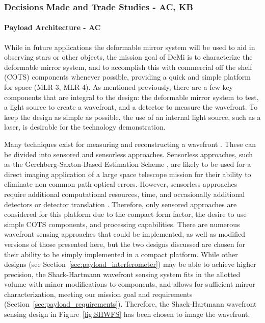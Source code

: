 \documentclass[12pt]{article}
\begin{document}
			\subsubsection{Decisions Made and Trade Studies - AC, KB}

\paragraph{Payload Architecture - AC}

While in future applications the deformable mirror system will be used to aid
in observing stars or other objects, the mission goal of DeMi is to characterize the deformable 
mirror system, and to accomplish this with commercial off the shelf (COTS) components
whenever possible, providing a quick and simple platform for space (MLR-3, MLR-4).
As mentioned previously, there are a few key components that are integral to the design: the 
deformable mirror system to test, a light source to create a wavefront, and a detector to measure the wavefront.
To keep the design as simple as possible, the use of an internal light source, such as a laser, is  desirable for the technology demonstration. 

Many techniques exist for measuring and reconstructing a wavefront \cite{FGadaptiveoptics}.  These can be divided into sensored and sensorless approaches.
Sensorless approaches, such as the Gerchberg-Saxton-Based Estimation Scheme \cite{gerchberg}, are likely to be used for a direct imaging application of a large space telescope mission for their ability to eliminate non-common path optical errors.  However, sensorless approaches require additional computational resources, time, and occasionally additional detectors or detector translation \cite{cahoy2013}.  
Therefore, only sensored
approaches are considered for this platform due to the compact form
factor, the desire to use simple COTS components, and processing capabilities. There are numerous wavefront
sensing approaches that could be implemented, as well as
modified versions of those presented here, but the two designs discussed are chosen for their ability to be simply implemented in a compact platform.
While other designs (see Section~\ref{sec:payload_interferometer}) may be able to achieve higher precision, the Shack-Hartmann wavefront sensing system fits in the allotted volume with minor modifications to components, and allows for sufficient mirror characterization, meeting our mission goal and requirements (Section~\ref{sec:payload_requirements}). Therefore, the Shack-Hartmann wavefront sensing design in Figure~\ref{fig:SHWFS} has been chosen to image the wavefront.
\end{document}
